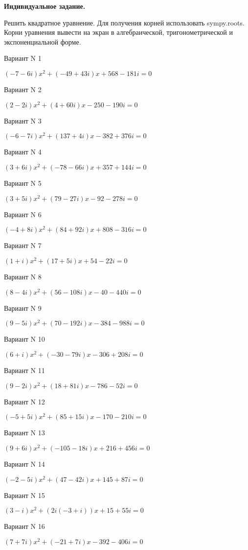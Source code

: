 \documentclass[11pt]{report}
\begin{document}
\pagestyle{empty}

{\bf Индивидуальное задание.}


Решить квадратное уравнение.
Для получения корней использовать sympy.roots.
Корни уравнения вывести на экран в алгебраической, тригонометрической и экспоненциальной форме.

Вариант N 1

$(-7 - 6 i)x^2 + (-49 + 43 i)x + 568 - 181 i = 0$

Вариант N 2

$(2 - 2 i)x^2 + (4 + 60 i)x  -250 - 190 i = 0$

Вариант N 3

$(-6 - 7 i)x^2 + (137 + 4 i)x  -382 + 376 i = 0$

Вариант N 4

$(3 + 6 i)x^2 + (-78 - 66 i)x + 357 + 144 i = 0$

Вариант N 5

$(3 + 5 i)x^2 + (79 - 27 i)x  -92 - 278 i = 0$

Вариант N 6

$(-4 + 8 i)x^2 + (84 + 92 i)x + 808 - 316 i = 0$

Вариант N 7

$(1 + i)x^2 + (17 + 5 i)x + 54 - 22 i = 0$

Вариант N 8

$(8 - 4 i)x^2 + (56 - 108 i)x  -40 - 440 i = 0$

Вариант N 9

$(9 - 5 i)x^2 + (70 - 192 i)x  -384 - 988 i = 0$

Вариант N 10

$(6 + i)x^2 + (-30 - 79 i)x  -306 + 208 i = 0$

Вариант N 11

$(9 - 2 i)x^2 + (18 + 81 i)x  -786 - 52 i = 0$

Вариант N 12

$(-5 + 5 i)x^2 + (85 + 15 i)x  -170 - 210 i = 0$

Вариант N 13

$(9 + 6 i)x^2 + (-105 - 18 i)x + 216 + 456 i = 0$

Вариант N 14

$(-2 - 5 i)x^2 + (47 - 42 i)x + 145 + 87 i = 0$

Вариант N 15

$(3 - i)x^2 + (2 i \left(-3 + i\right))x + 15 + 55 i = 0$

Вариант N 16

$(7 + 7 i)x^2 + (-21 + 7 i)x  -392 - 406 i = 0$
\end{document}
